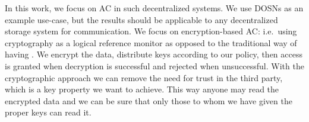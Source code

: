 In this work, we focus on \ac{AC} in such decentralized systems.
We use \acp{DOSN} as an example use-case, but the results should be applicable 
to any decentralized storage system for communication.
We focus on encryption-based \ac{AC}: i.e.\ using cryptography as a logical 
reference monitor as opposed to the traditional way of having .
We encrypt the data, distribute keys according to our policy, then access is 
granted when decryption is successful and rejected when unsuccessful.
With the cryptographic approach we can remove the need for trust in the third 
party, which is a key property we want to achieve.
This way anyone may read the encrypted data and we can be sure that only those 
to whom we have given the proper keys can read it.

%


